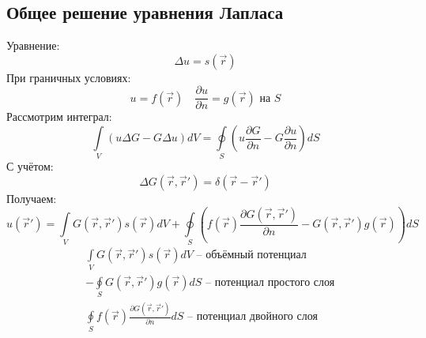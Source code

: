 \subsection{Общее решение уравнения Лапласа}

Уравнение:
\[
	\Delta u = s(\vec{r})
\]
При граничных условиях:
\[
	u = f(\vec{r}) \quad \frac{\partial u}{\partial n} = g(\vec{r}) \text{ на } S
\]
Рассмотрим интеграл:
\[
	\int\limits_V (u \Delta G - G \Delta u) dV = 
	\oint\limits_S \left(u \frac{\partial G}{\partial n} - G \frac{\partial u}{\partial n}\right) dS
\]
С учётом:
\[
	\Delta G(\vec{r}, \vec{r}') = \delta (\vec{r} - \vec{r}')
\]
Получаем:
\[
	u(\vec{r}') = \int\limits_V G(\vec{r}, \vec{r}') s(\vec{r}) dV + \oint\limits_S \left(f(\vec{r}) \frac{\partial G(\vec{r}, \vec{r}')}{\partial n} - G(\vec{r}, \vec{r}') g(\vec{r}) \right) dS
\]
\[
	\begin{aligned}
	&
	\int\limits_V G(\vec{r}, \vec{r}') s(\vec{r}) dV
	\text{ -- объёмный потенциал}
	\\
	& - \oint\limits_S G(\vec{r}, \vec{r}') g(\vec{r}) dS 
	\text{ -- потенциал простого слоя}
	\\
	& \oint\limits_S f(\vec{r}) \frac{\partial G(\vec{r}, \vec{r}')}{\partial n} dS
	\text{ -- потенциал двойного слоя}
	\end{aligned}
\]